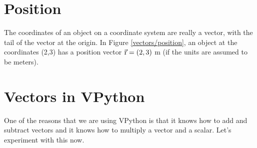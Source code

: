 
\section*{Position}

The coordinates of an object on a coordinate system are really a vector, with the tail of the vector at the origin. In Figure \ref{vectors/position}, an object at the coordinates (2,3) has a position vector $\vec{\mathrm{r}}=(2,3)$ m (if the units are assumed to be meters). 


\section*{Vectors in VPython}

One of the reasons that we are using VPython is that it knows how to add and subtract vectors and it knows how to multiply a vector and a scalar. Let's experiment with this now.

